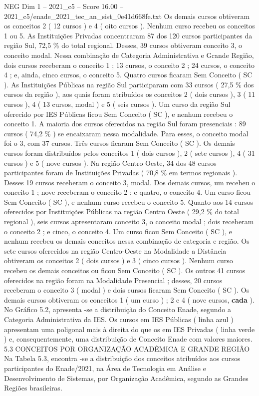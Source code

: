 \begin{textsample}{NEG Dim 1 – 2021\_c5 – Score 16.00 – 2021\_c5/enade\_2021\_tec\_an\_sist\_0e41d668fe.txt}
Os demais cursos obtiveram os conceitos 2 ( 12 cursos ) e 4 ( oito cursos ).
Nenhum curso recebeu os conceitos 1 ou 5.
As Instituições Privadas concentraram 87 dos 120 cursos participantes da região Sul, 72,5 \% do total regional.
Desses, 39 cursos obtiveram conceito 3, o conceito modal.
Nessa combinação de Categoria Administrativa e Grande Região, dois cursos receberam o conceito 1 ; 13 cursos, o conceito 2 ; 24 cursos, o conceito 4 ; e, ainda, cinco cursos, o conceito 5.
Quatro cursos ficaram Sem Conceito ( SC ).
As Instituições Públicas na região Sul participaram com 33 cursos ( 27,5 \% dos cursos da região ), aos quais foram atribuídos os conceitos 2 ( dois cursos ), 3 ( 11 cursos ), 4 ( 13 cursos, modal ) e 5 ( seis cursos ).
Um curso da região Sul oferecido por IES Públicas ficou Sem Conceito ( SC ), e nenhum recebeu o conceito 1.
A maioria dos cursos oferecidos na região Sul foram presenciais : 89 cursos ( 74,2 \% ) se encaixaram nessa modalidade.
Para esses, o conceito modal foi o 3, com 37 cursos.
Três cursos ficaram Sem Conceito ( SC ).
Os demais cursos foram distribuídos pelos conceitos 1 ( dois cursos ), 2 ( sete cursos ), 4 ( 31 cursos ) e 5 ( nove cursos ).
Na região Centro Oeste, 34 dos 48 cursos participantes foram de Instituições Privadas ( 70,8 \% em termos regionais ).
Desses 19 cursos receberam o conceito 3, modal.
Dos demais cursos, um recebeu o conceito 1 ; nove receberam o conceito 2 ; e quatro, o conceito 4.
Um curso ficou Sem Conceito ( SC ), e nenhum curso recebeu o conceito 5.
Quanto aos 14 cursos oferecidos por Instituições Públicas na região Centro Oeste ( 29,2 \% do total regional ), seis cursos apresentaram conceito 3, o conceito modal ; dois receberam o conceito 2 ; e cinco, o conceito 4.
Um curso ficou Sem Conceito ( SC ), e nenhum recebeu os demais conceitos nessa combinação de categoria e região.
Os sete cursos oferecidos na região Centro-Oeste na Modalidade a Distância obtiveram os conceitos 2 ( dois cursos ) e 3 ( cinco cursos ).
Nenhum curso recebeu os demais conceitos ou ficou Sem Conceito ( SC ).
Os outros 41 cursos oferecidos na região foram na Modalidade Presencial ; desses, 20 cursos receberam o conceito 3 ( modal ) e dois cursos ficaram Sem Conceito ( SC ).
Os demais cursos obtiveram os conceitos 1 ( um curso ) ; 2 e 4 ( nove cursos, \textbf{cada} ).
No Gráfico 5.2, apresenta -se a distribuição do Conceito Enade, segundo a Categoria Administrativa da IES.
Os cursos em IES Públicas ( linha azul ) apresentam uma poligonal mais à direita do que os em IES Privadas ( linha verde ) e, consequentemente, uma distribuição de Conceito Enade com valores maiores. 5.3 CONCEITOS POR ORGANIZAÇÃO ACADÊMICA E GRANDE REGIÃO Na Tabela 5.3, encontra -se a distribuição dos conceitos atribuídos aos cursos participantes do Enade/2021, na Área de Tecnologia em Análise e Desenvolvimento de Sistemas, por Organização Acadêmica, segundo as Grandes Regiões brasileiras.

\end{textsample}
